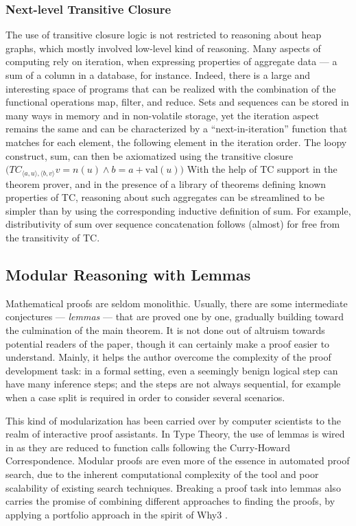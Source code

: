 \subsubsection{Next-level Transitive Closure}

The use of transitive closure logic is not restricted to reasoning about heap
graphs, which mostly involved low-level kind of reasoning.
Many aspects of computing rely on iteration, \eg when expressing properties of
aggregate data --- a sum of a column in a database, for instance.
Indeed, there is a large and interesting space of programs that can be realized
with the combination of the functional operations \textsf{map}, \textsf{filter},
and \textsf{reduce}. %
Sets and sequences can be stored in many ways in memory and in non-volatile
storage, yet the iteration aspect remains the same and can be characterized by
a ``next-in-iteration'' function that matches for each element, the following
element in the iteration order.
The loopy construct, \eg sum, can then be axiomatized using the transitive
closure $\big(TC_{\langle a,u\rangle,\langle b,v\rangle}v=n(u) \land b=a+\mathrm{val}(u)\big)$
With the help of TC support in the theorem prover, and in the presence of a
library of theorems defining known properties of TC, reasoning about such
aggregates can be streamlined to be simpler than by using the corresponding
inductive definition of sum.
For example, distributivity of sum over sequence concatenation follows (almost)
for free from the transitivity of TC.



\subsection{Modular Reasoning with Lemmas}

Mathematical proofs are seldom monolithic.
Usually, there are some intermediate conjectures --- \emph{lemmas} --- that
are proved one by one, gradually building toward the culmination of the main
theorem.
It is not done out of altruism towards potential readers of the paper, though it can
certainly make a proof easier to understand.
Mainly, it helps the author overcome the complexity of the proof development
task: in a formal setting, even a seemingly benign logical step can have many
inference steps; and the steps are not always sequential, for example when
a case split is required in order to consider several scenarios.

This kind of modularization has been carried over by computer scientists to the
realm of interactive proof assistants.
In Type Theory, the use of lemmas is wired in as they are reduced to function
calls following the Curry-Howard Correspondence.
Modular proofs are even more of the essence in automated proof search, due to
the inherent computational complexity of the tool and poor scalability of
existing search techniques.
Breaking a proof task into lemmas also carries the promise of combining different
approaches to finding the proofs, by applying a portfolio approach in the spirit
of Why3 \cite{}.

